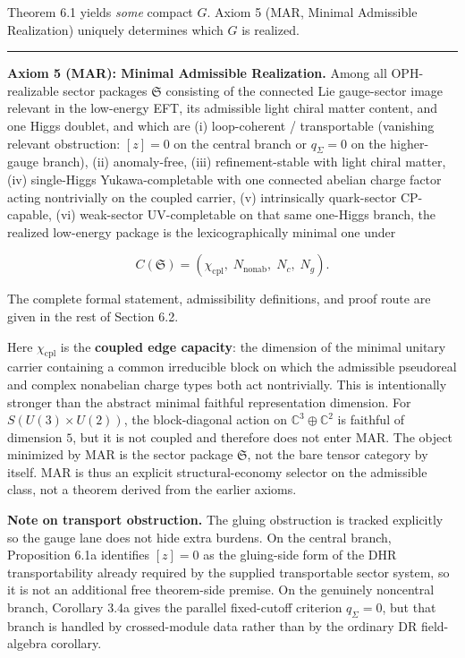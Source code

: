 Theorem 6.1 yields \emph{some} compact \(G\). Axiom 5 (MAR, Minimal Admissible Realization) uniquely determines which \(G\) is realized.

\begin{center}\rule{0.5\linewidth}{0.5pt}\end{center}

\textbf{Axiom 5 (MAR): Minimal Admissible Realization.} Among all OPH-realizable sector packages \(\mathfrak S\) consisting of the connected Lie gauge-sector image relevant in the low-energy EFT, its admissible light chiral matter content, and one Higgs doublet, and which are (i) loop-coherent / transportable (vanishing relevant obstruction: \([z]=0\) on the central branch or \(q_\Sigma=0\) on the higher-gauge branch), (ii) anomaly-free, (iii) refinement-stable with light chiral matter, (iv) single-Higgs Yukawa-completable with one connected abelian charge factor acting nontrivially on the coupled carrier, (v) intrinsically quark-sector CP-capable, (vi) weak-sector UV-completable on that same one-Higgs branch, the realized low-energy package is the lexicographically minimal one under

\[C(\mathfrak S) = (\chi_{\mathrm{cpl}},\; N_{\mathrm{nonab}},\; N_c,\; N_g).\]

The complete formal statement, admissibility definitions, and proof route are given in the rest of Section 6.2.

Here \(\chi_{\mathrm{cpl}}\) is the \textbf{coupled edge capacity}: the dimension of the minimal unitary carrier containing a common irreducible block on which the admissible pseudoreal and complex nonabelian charge types both act nontrivially. This is intentionally stronger than the abstract minimal faithful representation dimension. For \(S(U(3)\times U(2))\), the block-diagonal action on \(\mathbb{C}^3 \oplus \mathbb{C}^2\) is faithful of dimension \(5\), but it is not coupled and therefore does not enter MAR. The object minimized by MAR is the sector package \(\mathfrak S\), not the bare tensor category by itself. MAR is thus an explicit structural-economy selector on the admissible class, not a theorem derived from the earlier axioms.

\textbf{Note on transport obstruction.} The gluing obstruction is tracked explicitly so the gauge lane does not hide extra burdens. On the central branch, Proposition 6.1a identifies \([z]=0\) as the gluing-side form of the DHR transportability already required by the supplied transportable sector system, so it is not an additional free theorem-side premise. On the genuinely noncentral branch, Corollary 3.4a gives the parallel fixed-cutoff criterion \(q_\Sigma=0\), but that branch is handled by crossed-module data rather than by the ordinary DR field-algebra corollary.

